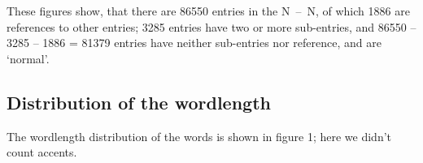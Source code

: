 These figures show, that there are 86550 entries in the N~--~N, of which 1886
are references to other entries; 3285 entries have two or more sub-entries, and
86550 -- 3285 -- 1886 = 81379 entries have neither sub-entries nor reference,
and are `normal'. 

\subsection{Distribution of the wordlength}
The wordlength distribution of the words is shown in figure 1; here we didn't
count accents. 

 \newcommand{\sety} [2]{\put(15,#1) {\makebox(0,0)[r]{\tiny #2}}
                        \put(20,#1) {\line(1,0){3}}}

 \newcommand{\setxy}[3]{\put(#1,#2) {\makebox(0,0)[b]{\tiny #3}}
                        \put(#1, 0) {\line(0,1){4}}}

 \newcommand{\setxh}[2]{\setxy{#1}{-10}{#2}}

 \newcommand{\setxl}[2]{\setxy{#1}{-13}{#2}}

 \newcommand{\ptln} [2]{\put(#1,#2){\circle{3}}}

